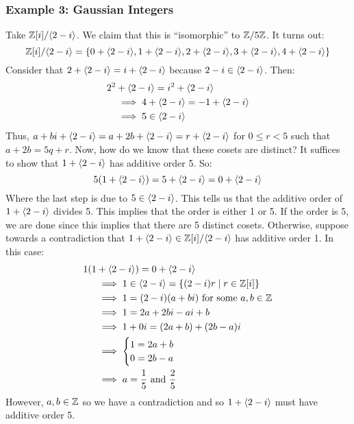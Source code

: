 \documentclass[letterpaper]{article}
\begin{document}
\subsubsection{Example 3: Gaussian Integers}
Take $\mathbb{Z}[i] / \langle 2 - i \rangle$. We claim that this is ``isomorphic'' to $\mathbb{Z} / 5\mathbb{Z}$. It turns out:
\[\mathbb{Z}[i] / \langle 2 - i \rangle = \{0 + \langle 2 - i \rangle, 1 + \langle 2 - i \rangle, 2 + \langle 2 - i \rangle, 3 + \langle 2 - i \rangle, 4 + \langle 2 - i \rangle\}\] 
Consider that $2 + \langle 2 - i \rangle = i + \langle 2 - i \rangle$ because $2 - i \in \langle 2 - i \rangle$. Then:
\begin{equation*}
    \begin{aligned}
        2^2 &+ \langle 2 - i \rangle = i^2 + \langle 2 - i \rangle \\ 
            &\implies 4 + \langle 2 - i \rangle = -1 + \langle 2 - i \rangle \\ 
            &\implies 5 \in \langle 2 - i \rangle
    \end{aligned}
\end{equation*}
Thus, $a + bi + \langle 2 - i \rangle = a + 2b + \langle 2 - i \rangle = r + \langle 2 - i \rangle$ for $0 \leq r < 5$ such that $a + 2b = 5q + r$. Now, how do we know that these cosets are distinct? It suffices to show that $1 + \langle 2 - i \rangle$ has additive order 5. So: 
\[5(1 + \langle 2 - i \rangle) = 5 + \langle 2 - i \rangle = 0 + \langle 2 - i \rangle\]
Where the last step is due to $5 \in \langle 2 - i \rangle$. This tells us that the additive order of $1 + \langle 2 - i \rangle$ divides 5. This implies that the order is either 1 or 5. If the order is 5, we are done since this implies that there are 5 distinct cosets. Otherwise, suppose towards a contradiction that $1 + \langle 2 - i \rangle \in \mathbb{Z}[i] / \langle 2 - i \rangle$ has additive order 1. In this case:
\begin{equation*}
    \begin{aligned}
        1(1 &+ \langle 2 - i \rangle) = 0 + \langle 2 - i \rangle \\ 
            &\implies 1 \in \langle 2 - i \rangle = \{(2 - i)r \mid r \in \mathbb{Z}[i]\}\\ 
            &\implies 1 = (2 - i)(a + bi) \text{ for some } a, b \in \mathbb{Z} \\
            &\implies 1 = 2a + 2bi - ai + b \\ 
            &\implies 1 + 0i = (2a + b) + (2b - a)i \\ 
            &\implies \begin{cases}
                1 = 2a + b \\ 
                0 = 2b - a 
            \end{cases}  \\ 
            &\implies a = \frac{1}{5} \text{ and } \frac{2}{5}
    \end{aligned}
\end{equation*}
However, $a, b \in \mathbb{Z}$ so we have a contradiction and so $1 + \langle 2 - i \rangle$ must have additive order 5. 
\end{document}
